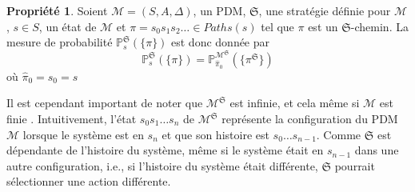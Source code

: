 \documentclass[12pt,a4paper]{report}
\theoremstyle{definition}%
\newtheorem{propriete}{Propriété}[chapter]
\theoremstyle{remark}
\newcommand{\pr}{\mathbb{P}}
\begin{document}
\begin{propriete}
Soient $\mathcal{M} = (S, A, \Delta)$, un PDM, $\mathfrak{S}$, une stratégie définie pour
$\mathcal{M}$, $s \in S$, un état de $\mathcal{M}$ et $\pi = s_0 s_1 s_2 \dots \in Paths(s)$ tel que $\pi$ est un $\mathfrak{S}$-chemin. La
mesure de probabilité $\pr^\mathfrak{S}_s(\{\pi\})$ est donc donnée par
\[
		\pr^\mathfrak{S}_s(\{\pi\}) = \pr^{\mathcal{M}^\mathfrak{S}}_{\hat{\pi}_0}(\{\pi^\mathfrak{S}\})
\]
où $\hat{\pi}_0 = s_0 = s$
\end{propriete}
Il est cependant important de noter que $\mathcal{M}^\mathfrak{S}$ est infinie, et cela
même si $\mathcal{M}$ est finie%
. Intuitivement, l'état $s_0 s_1 \dots s_n$ de
$\mathcal{M}^\mathfrak{S}$ représente la configuration du PDM $\mathcal{M}$ lorsque
le système est en $s_n$ et que son histoire est $s_0 \dots s_{n-1}$. Comme
$\mathfrak{S}$ est dépendante de l'histoire du système, même si le système était en $s_{n-1}$ dans une autre configuration, i.e., si l'histoire du système était
différente, $\mathfrak{S}$ pourrait sélectionner une action
différente.
\end{document}
